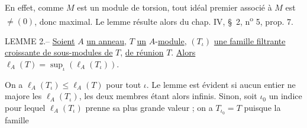 En effet, comme $M$ est un module de torsion, tout idéal premier associé à $M$ est $\ne(0)$, donc maximal. Le lemme résulte alors du chap. IV, \S\ 2, n\textsuperscript{o} 5, prop. 7.

LEMME 2.-- \uline{Soient} $A$ \uline{un anneau}, $T$ \uline{un} $A$-\uline{module}, $(T_\iota)$ \uline{une famille filtrante croissante de sous-modules de} $T$, \uline{de réunion} $T$. \uline{Alors} $\ell_A(T)=\sup_\iota(\ell_A(T_\iota))$.

On a $\ell_A(T_\iota)\leq\ell_A(T)$ pour tout $\iota$. Le lemme est évident si aucun entier ne majore les $\ell_A(T_\iota)$, les deux membres étant alors infinis. Sinon, soit $\iota_0$ un indice pour lequel $\ell_A(T_\iota)$ prenne sa plus grande valeur ; on a $T_{\iota_0}=T$ puisque la famille
